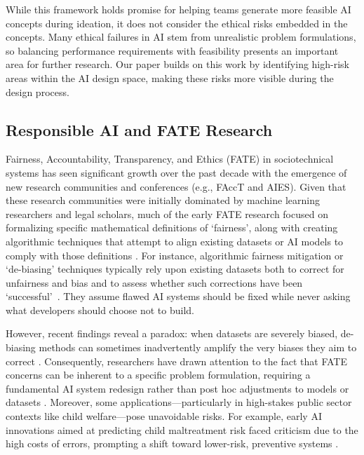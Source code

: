 While this framework holds promise for helping teams generate more feasible AI concepts during ideation, it does not consider the ethical risks embedded in the concepts. Many ethical failures in AI stem from unrealistic problem formulations, so balancing performance requirements with feasibility presents an important area for further research. Our paper builds on this work by identifying high-risk areas within the AI design space, making these risks more visible during the design process.


\subsection{Responsible AI and FATE Research}\label{subsec:RAI_FATE}

Fairness, Accountability, Transparency, and Ethics (FATE) in sociotechnical systems has seen significant growth over the past decade with the emergence of new research communities and conferences (e.g., FAccT and AIES). Given that these research communities were initially dominated by machine learning researchers and legal scholars, much of the early FATE research focused on formalizing specific mathematical definitions of `fairness', along with creating algorithmic techniques that attempt to align existing datasets or AI models to comply with those definitions \cite{selbst2019fairness}. For instance, algorithmic fairness mitigation or `de-biasing' techniques typically rely upon existing datasets both to correct for unfairness and bias and to assess whether such corrections have been `successful'~\cite{Cooper2021-ft, dutta2020there, kallus2018residual}. They assume flawed AI systems should be fixed while never asking what developers should choose not to build.

However, recent findings reveal a paradox: when datasets are severely biased, de-biasing methods can sometimes inadvertently amplify the very biases they aim to correct \cite{Cooper2021-ft, dutta2020there, kallus2018residual}. Consequently, researchers have drawn attention to the fact that FATE concerns can be inherent to a specific problem formulation, requiring a fundamental AI system redesign rather than post hoc adjustments to models or datasets \cite{boyarskaya2020overcoming, holstein2019improving, passi2019problem, Raji2022-ls}. Moreover, some applications—particularly in high-stakes public sector contexts like child welfare—pose unavoidable risks. For example, early AI innovations aimed at predicting child maltreatment risk faced criticism due to the high costs of errors, prompting a shift toward lower-risk, preventive systems \cite{Eubanks2018-dk, Kawakami2022-ez, Stapleton2022-eb, saxena2024algorithmic}. 

